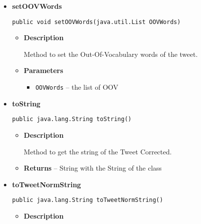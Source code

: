 {{{{{{{{{\begin{itemize}
{\begin{itemize}
{Method to set the corrected tweet.
}
\item{
{\bf  Parameters}
  \begin{itemize}
   \item{
\texttt{correctedText} -- the corrected text}
  \end{itemize}
}%
\end{itemize}
}%
\item{ 
\hypertarget{com.jmorenov.tweetsccore.twitter.TweetCorrected.setOOVWords(java.util.List)}{{\bf  setOOVWords}\\}
\begin{lstlisting}[frame=none]
public void setOOVWords(java.util.List OOVWords)\end{lstlisting} %
\begin{itemize}
\item{
{\bf  Description}

Method to set the Out-Of-Vocabulary words of the tweet.
}
\item{
{\bf  Parameters}
  \begin{itemize}
   \item{
\texttt{OOVWords} -- the list of OOV}
  \end{itemize}
}%
\end{itemize}
}%
\item{ 
\hypertarget{com.jmorenov.tweetsccore.twitter.TweetCorrected.toString()}{{\bf  toString}\\}
\begin{lstlisting}[frame=none]
public java.lang.String toString()\end{lstlisting} %
\begin{itemize}
\item{
{\bf  Description}

Method to get the string of the Tweet Corrected.
}
\item{{\bf  Returns} -- 
String with the String of the class 
}%
\end{itemize}
}%
\item{ 
\hypertarget{com.jmorenov.tweetsccore.twitter.TweetCorrected.toTweetNormString()}{{\bf  toTweetNormString}\\}
\begin{lstlisting}[frame=none]
public java.lang.String toTweetNormString()\end{lstlisting} %
\begin{itemize}
\item{
{\bf  Description}

}
\end{itemize}}
\end{itemize}}}}}}}}}}
